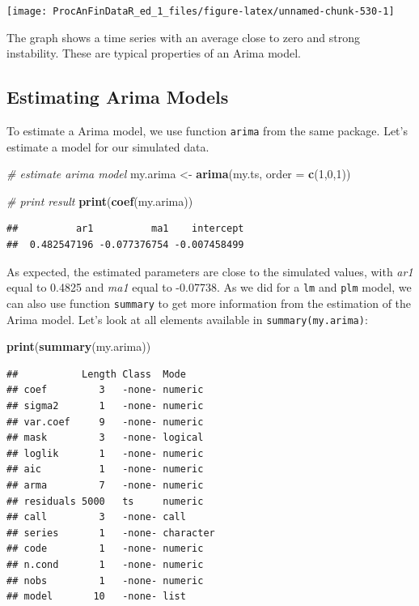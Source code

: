 \documentclass[11pt,]{book}
\newenvironment{Shaded}{\begin{snugshade}}{\end{snugshade}}
\newcommand{\KeywordTok}[1]{\textcolor[rgb]{0.27,0.27,0.27}{\textbf{#1}}}
\newcommand{\DataTypeTok}[1]{\textcolor[rgb]{0.27,0.27,0.27}{#1}}
\newcommand{\DecValTok}[1]{\textcolor[rgb]{0.06,0.06,0.06}{#1}}
\newcommand{\StringTok}[1]{\textcolor[rgb]{0.5,0.5,0.5}{#1}}
\newcommand{\CommentTok}[1]{\textcolor[rgb]{0.56,0.35,0.01}{\textit{#1}}}
\newcommand{\NormalTok}[1]{#1}
\begin{document}
\begin{center}\texttt{[image: ProcAnFinDataR\_ed\_1\_files/figure-latex/unnamed-chunk-530-1]} \end{center}

The graph shows a time series with an average close to zero and strong
instability. These are typical properties of an Arima model.

\subsection{Estimating Arima Models}\label{arima-estimating}

To estimate a Arima model, we use function \texttt{arima} from the same
package. Let's estimate a model for our simulated data.

\begin{Shaded}
\begin{Highlighting}[]
\CommentTok{# estimate arima model}
\NormalTok{my.arima <-}\StringTok{ }\KeywordTok{arima}\NormalTok{(my.ts, }\DataTypeTok{order =} \KeywordTok{c}\NormalTok{(}\DecValTok{1}\NormalTok{,}\DecValTok{0}\NormalTok{,}\DecValTok{1}\NormalTok{))}

\CommentTok{# print result}
\KeywordTok{print}\NormalTok{(}\KeywordTok{coef}\NormalTok{(my.arima))}
\end{Highlighting}
\end{Shaded}

\begin{verbatim}
##          ar1          ma1    intercept 
##  0.482547196 -0.077376754 -0.007458499
\end{verbatim}

As expected, the estimated parameters are close to the simulated values,
with \emph{ar1} equal to 0.4825 and \emph{ma1} equal to -0.07738. As we
did for a \texttt{lm} and \texttt{plm} model, we can also use function
\texttt{summary} to get more information from the estimation of the
Arima model. Let's look at all elements available in
\texttt{summary(my.arima)}: 

\begin{Shaded}
\begin{Highlighting}[]
\KeywordTok{print}\NormalTok{(}\KeywordTok{summary}\NormalTok{(my.arima))}
\end{Highlighting}
\end{Shaded}

\begin{verbatim}
##           Length Class  Mode     
## coef         3   -none- numeric  
## sigma2       1   -none- numeric  
## var.coef     9   -none- numeric  
## mask         3   -none- logical  
## loglik       1   -none- numeric  
## aic          1   -none- numeric  
## arma         7   -none- numeric  
## residuals 5000   ts     numeric  
## call         3   -none- call     
## series       1   -none- character
## code         1   -none- numeric  
## n.cond       1   -none- numeric  
## nobs         1   -none- numeric  
## model       10   -none- list
\end{verbatim}
\end{document}
